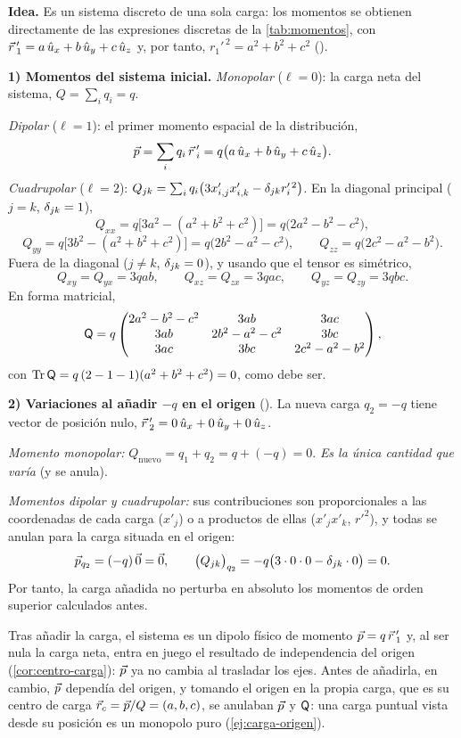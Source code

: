 \begin{resolucion}
\textbf{Idea.} Es un sistema discreto de una sola carga: los momentos se obtienen directamente de las expresiones discretas de la \cref{tab:momentos}, con
$\vec{r}\,'_1=a\,\hat{u}_{x}+b\,\hat{u}_{y}+c\,\hat{u}_{z}$ y, por tanto, $r_1'^{\,2}=a^{2}+b^{2}+c^{2}$ ().

\textbf{1) Momentos del sistema inicial.} \emph{Monopolar} ($\ell=0$): la carga neta del sistema, $Q=\sum_iq_i=q$.

\emph{Dipolar} ($\ell=1$): el primer momento espacial de la distribución,
\[
  \vec{p}=\sum_iq_i\,\vec{r}\,'_i=q\bigl(a\,\hat{u}_{x}+b\,\hat{u}_{y}+c\,\hat{u}_{z}\bigr).
\]
\emph{Cuadrupolar} ($\ell=2$): $Q_{jk}=\sum_iq_i\bigl(3x'_{i,j}x'_{i,k}-\delta_{jk}r_i'^{\,2}\bigr)$. En la diagonal principal ($j=k$, $\delta_{jk}=1$),
\[
  Q_{xx}=q\bigl[3a^{2}-(a^{2}+b^{2}+c^{2})\bigr]=q\bigl(2a^{2}-b^{2}-c^{2}\bigr),
\]
\[
  Q_{yy}=q\bigl[3b^{2}-(a^{2}+b^{2}+c^{2})\bigr]=q\bigl(2b^{2}-a^{2}-c^{2}\bigr),\qquad
  Q_{zz}=q\bigl(2c^{2}-a^{2}-b^{2}\bigr).
\]
Fuera de la diagonal ($j\neq k$, $\delta_{jk}=0$), y usando que el tensor es simétrico,
\[
  Q_{xy}=Q_{yx}=3qab,\qquad Q_{xz}=Q_{zx}=3qac,\qquad Q_{yz}=Q_{zy}=3qbc .
\]
En forma matricial,
\[
  \mathsf{Q}=q\begin{pmatrix}2a^{2}-b^{2}-c^{2}&3ab&3ac\\3ab&2b^{2}-a^{2}-c^{2}&3bc\\3ac&3bc&2c^{2}-a^{2}-b^{2}\end{pmatrix},
\]
con $\operatorname{Tr}\mathsf{Q}=q\,(2-1-1)(a^{2}+b^{2}+c^{2})=0$, como debe ser.

\textbf{2) Variaciones al añadir $-q$ en el origen} (). La nueva carga $q_2=-q$ tiene vector de posición nulo, $\vec{r}\,'_2=0\,\hat{u}_{x}+0\,\hat{u}_{y}+0\,\hat{u}_{z}$.

\emph{Momento monopolar:} $Q_{\mathrm{nuevo}}=q_1+q_2=q+(-q)=0$. \emph{Es la única cantidad que varía} (y se anula).

\emph{Momentos dipolar y cuadrupolar:} sus contribuciones son proporcionales a las coordenadas de cada carga ($x'_j$) o a productos de ellas ($x'_jx'_k$, $r'^{2}$), y todas
se anulan para la carga situada en el origen:
\[
  \vec{p}_{q_2}=(-q)\,\vec{0}=\vec{0},\qquad \bigl(Q_{jk}\bigr)_{q_2}=-q\bigl(3\cdot0\cdot0-\delta_{jk}\cdot0\bigr)=0 .
\]
Por tanto, la carga añadida no perturba en absoluto los momentos de orden superior calculados antes.
\end{resolucion}



\begin{observacion}[Interpretación]\label{obs:sem-carga}
Tras añadir la carga, el sistema es un dipolo físico de momento $\vec{p}=q\,\vec{r}\,'_1$ y, al ser nula la carga neta, entra en juego el resultado de independencia del origen
(\cref{cor:centro-carga}): $\vec{p}$ ya no cambia al trasladar los ejes. Antes de añadirla, en cambio, $\vec{p}$ dependía del origen, y tomando el origen en la propia carga, que es su
centro de carga $\vec{r}_c=\vec{p}/Q=(a,b,c)$, se anulaban $\vec{p}$ y $\mathsf{Q}$: una carga puntual vista desde su posición es un monopolo puro (\cref{ej:carga-origen}).
\end{observacion}

